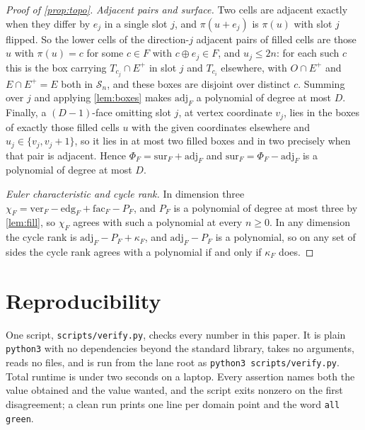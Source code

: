 \documentclass[11pt]{amsart}
\theoremstyle{definition}
\theoremstyle{remark}
\begin{document}
\begin{proof}[Proof of \cref{prop:topo}]
\emph{Adjacent pairs and surface.} Two cells are adjacent exactly when they differ by $e_{j}$ in a single slot $j$, and $\pi(u+e_{j})$ is $\pi(u)$ with slot $j$ flipped. So the lower cells of the direction-$j$ adjacent pairs of filled cells are those $u$ with $\pi(u)=c$ for some $c \in F$ with $c \oplus e_{j} \in F$, and $u_{j} \le 2n$: for each such $c$ this is the box carrying $T_{c_{j}} \cap E^{+}$ in slot $j$ and $T_{c_{i}}$ elsewhere, with $O \cap E^{+}$ and $E \cap E^{+} = E$ both in $\mathcal{S}_{n}$, and these boxes are disjoint over distinct $c$. Summing over $j$ and applying \cref{lem:boxes} makes $\mathrm{adj}_{F}$ a polynomial of degree at most $D$. Finally, a $(D-1)$-face omitting slot $j$, at vertex coordinate $v_{j}$, lies in the boxes of exactly those filled cells $u$ with the given coordinates elsewhere and $u_{j} \in \{v_{j},v_{j}+1\}$, so it lies in at most two filled boxes and in two precisely when that pair is adjacent. Hence $\Phi_{F} = \mathrm{sur}_{F} + \mathrm{adj}_{F}$ and $\mathrm{sur}_{F} = \Phi_{F} - \mathrm{adj}_{F}$ is a polynomial of degree at most $D$.

\emph{Euler characteristic and cycle rank.} In dimension three $\chi_{F} = \mathrm{ver}_{F} - \mathrm{edg}_{F} + \mathrm{fac}_{F} - P_{F}$, and $P_{F}$ is a polynomial of degree at most three by \cref{lem:fill}, so $\chi_{F}$ agrees with such a polynomial at every $n \ge 0$. In any dimension the cycle rank is $\mathrm{adj}_{F}-P_{F}+\kappa_{F}$, and $\mathrm{adj}_{F}-P_{F}$ is a polynomial, so on any set of sides the cycle rank agrees with a polynomial if and only if $\kappa_{F}$ does.
\end{proof}

\section{Reproducibility}
\label{sec:repro}

One script, \texttt{scripts/verify.py}, checks every number in this paper. It is plain \texttt{python3} with no dependencies beyond the standard library, takes no arguments, reads no files, and is run from the lane root as \texttt{python3 scripts/verify.py}. Total runtime is under two seconds on a laptop. Every assertion names both the value obtained and the value wanted, and the script exits nonzero on the first disagreement; a clean run prints one line per domain point and the word \texttt{all green}.
\end{document}
